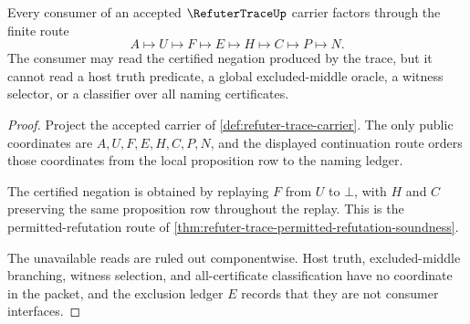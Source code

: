\begin{theorem}
\label{thm:refuter-trace-consumer-boundary}
Every consumer of an accepted $\RefuterTraceUp$ carrier factors through the finite route
$$
A \longmapsto U \longmapsto F \longmapsto E \longmapsto H \longmapsto C \longmapsto P \longmapsto N.
$$
The consumer may read the certified negation produced by the trace, but it cannot read a host truth predicate, a global excluded-middle oracle, a witness selector, or a classifier over all naming certificates.
\end{theorem}
\begin{proof}
Project the accepted carrier of \autoref{def:refuter-trace-carrier}. The only public coordinates are $A,U,F,E,H,C,P,N$, and the displayed continuation route orders those coordinates from the local proposition row to the naming ledger.

The certified negation is obtained by replaying $F$ from $U$ to $\bot$, with $H$ and $C$ preserving the same proposition row throughout the replay. This is the permitted-refutation route of \autoref{thm:refuter-trace-permitted-refutation-soundness}.

The unavailable reads are ruled out componentwise. Host truth, excluded-middle branching, witness selection, and all-certificate classification have no coordinate in the packet, and the exclusion ledger $E$ records that they are not consumer interfaces.
\end{proof}

